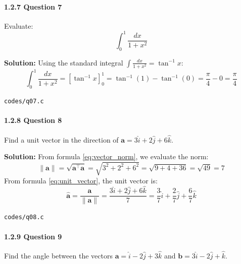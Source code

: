 \documentclass{article}
\begin{document}
\paragraph{1.2.7 Question 7}
Evaluate:
\begin{equation}
\int_0^1 \frac{dx}{1 + x^2}
\end{equation}

\textbf{Solution:} Using the standard integral $\int \frac{dx}{1 + x^2} = \tan^{-1} x$:
\begin{equation}
\int_0^1 \frac{dx}{1 + x^2} = \left[ \tan^{-1} x \right]_0^1 = \tan^{-1}(1) - \tan^{-1}(0) = \frac{\pi}{4} - 0 = \frac{\pi}{4}
\end{equation}
\begin{tcolorbox}[colback=gray!10,colframe=black,width=\linewidth]
\texttt{codes/q07.c}
\end{tcolorbox}

\paragraph{1.2.8 Question 8}
Find a unit vector in the direction of $\mathbf{a} = 3\hat{i} + 2\hat{j} + 6\hat{k}$.

\textbf{Solution:} From formula \eqref{eq:vector_norm}, we evaluate the norm:
\begin{equation}
\|\mathbf{a}\| = \sqrt{\mathbf{a}^\top \mathbf{a}} = \sqrt{3^2 + 2^2 + 6^2} = \sqrt{9 + 4 + 36} = \sqrt{49} = 7
\end{equation}
From formula \eqref{eq:unit_vector}, the unit vector is:
\begin{equation}
\hat{\mathbf{a}} = \frac{\mathbf{a}}{\|\mathbf{a}\|} = \frac{3\hat{i} + 2\hat{j} + 6\hat{k}}{7} = \frac{3}{7}\hat{i} + \frac{2}{7}\hat{j} + \frac{6}{7}\hat{k}
\end{equation}
\begin{tcolorbox}[colback=gray!10,colframe=black,width=\linewidth]
\texttt{codes/q08.c}
\end{tcolorbox}

\paragraph{1.2.9 Question 9}
Find the angle between the vectors $\mathbf{a} = \hat{i} - 2\hat{j} + 3\hat{k}$ and $\mathbf{b} = 3\hat{i} - 2\hat{j} + \hat{k}$.
\end{document}
